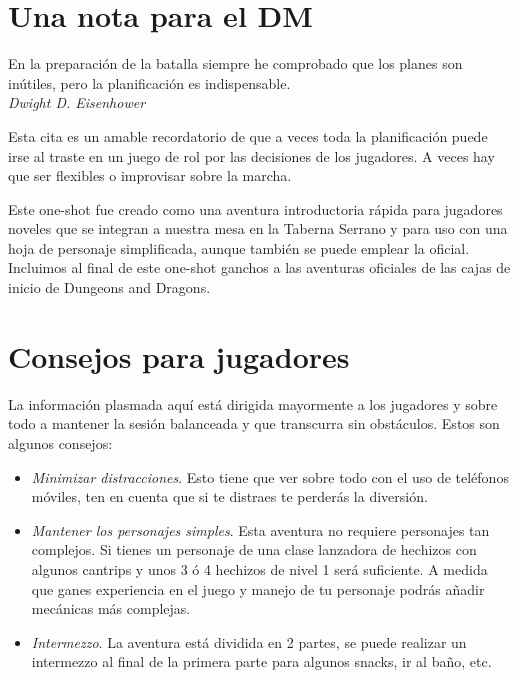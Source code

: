 \documentclass[10pt,twoside,twocolumn,openany]{dndbook}
\begin{document}
\section*{Una nota para el DM}

\begin{DndReadAloud}
  En la preparación de la batalla siempre he comprobado que los planes son inútiles, pero la 
  planificación es indispensable. \\
  \emph{Dwight D. Eisenhower}
\end{DndReadAloud}

Esta cita es un amable recordatorio de que a veces toda la planificación puede irse al traste 
en un juego de rol por las decisiones de los jugadores. A veces hay que ser flexibles o improvisar 
sobre la marcha.

Este one-shot fue creado como una aventura introductoria rápida para jugadores noveles que se 
integran a nuestra mesa en la Taberna Serrano y para uso con una hoja de personaje simplificada, 
aunque también se puede emplear la oficial. Incluimos al final de este one-shot ganchos a las 
aventuras oficiales de las cajas de inicio de Dungeons and Dragons.

\section*{Consejos para jugadores}

La información plasmada aquí está dirigida mayormente a los jugadores y sobre todo a mantener la 
sesión balanceada y que transcurra sin obstáculos. Estos son algunos consejos:

\begin{itemize}
  \item \emph{Minimizar distracciones}. Esto tiene que ver sobre todo con el uso de teléfonos 
  móviles, ten en cuenta que si te distraes te perderás la diversión.
  \item \emph{Mantener los personajes simples}. Esta aventura no requiere personajes tan complejos.
  Si tienes un personaje de una clase lanzadora de hechizos con algunos cantrips y unos 3 ó 4 
  hechizos de nivel 1 será suficiente. A medida que ganes experiencia en el juego y manejo de tu 
  personaje podrás añadir mecánicas más complejas.
  \item \emph{Intermezzo}. La aventura está dividida en 2 partes, se puede realizar un intermezzo 
  al final de la primera parte para algunos snacks, ir al baño, etc.
\end{itemize}
\end{document}
